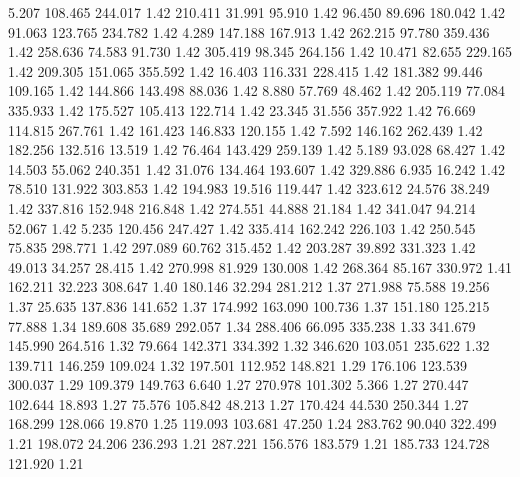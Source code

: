    5.207  108.465  244.017         1.42
 210.411   31.991   95.910         1.42
  96.450   89.696  180.042         1.42
  91.063  123.765  234.782         1.42
   4.289  147.188  167.913         1.42
 262.215   97.780  359.436         1.42
 258.636   74.583   91.730         1.42
 305.419   98.345  264.156         1.42
  10.471   82.655  229.165         1.42
 209.305  151.065  355.592         1.42
  16.403  116.331  228.415         1.42
 181.382   99.446  109.165         1.42
 144.866  143.498   88.036         1.42
   8.880   57.769   48.462         1.42
 205.119   77.084  335.933         1.42
 175.527  105.413  122.714         1.42
  23.345   31.556  357.922         1.42
  76.669  114.815  267.761         1.42
 161.423  146.833  120.155         1.42
   7.592  146.162  262.439         1.42
 182.256  132.516   13.519         1.42
  76.464  143.429  259.139         1.42
   5.189   93.028   68.427         1.42
  14.503   55.062  240.351         1.42
  31.076  134.464  193.607         1.42
 329.886    6.935   16.242         1.42
  78.510  131.922  303.853         1.42
 194.983   19.516  119.447         1.42
 323.612   24.576   38.249         1.42
 337.816  152.948  216.848         1.42
 274.551   44.888   21.184         1.42
 341.047   94.214   52.067         1.42
   5.235  120.456  247.427         1.42
 335.414  162.242  226.103         1.42
 250.545   75.835  298.771         1.42
 297.089   60.762  315.452         1.42
 203.287   39.892  331.323         1.42
  49.013   34.257   28.415         1.42
 270.998   81.929  130.008         1.42
 268.364   85.167  330.972         1.41
 162.211   32.223  308.647         1.40
 180.146   32.294  281.212         1.37
 271.988   75.588   19.256         1.37
  25.635  137.836  141.652         1.37
 174.992  163.090  100.736         1.37
 151.180  125.215   77.888         1.34
 189.608   35.689  292.057         1.34
 288.406   66.095  335.238         1.33
 341.679  145.990  264.516         1.32
  79.664  142.371  334.392         1.32
 346.620  103.051  235.622         1.32
 139.711  146.259  109.024         1.32
 197.501  112.952  148.821         1.29
 176.106  123.539  300.037         1.29
 109.379  149.763    6.640         1.27
 270.978  101.302    5.366         1.27
 270.447  102.644   18.893         1.27
  75.576  105.842   48.213         1.27
 170.424   44.530  250.344         1.27
 168.299  128.066   19.870         1.25
 119.093  103.681   47.250         1.24
 283.762   90.040  322.499         1.21
 198.072   24.206  236.293         1.21
 287.221  156.576  183.579         1.21
 185.733  124.728  121.920         1.21
